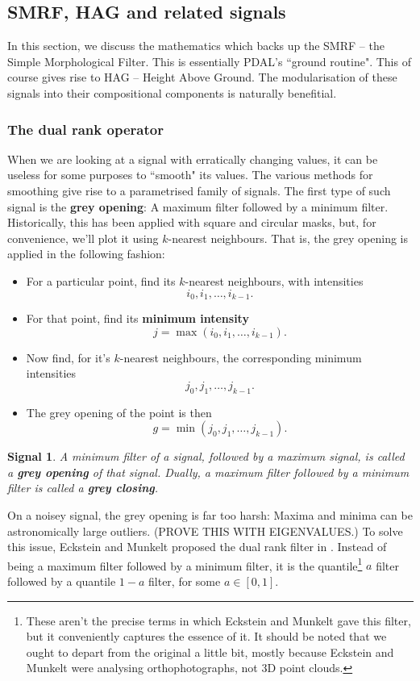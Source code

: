 \documentclass[a4paper,11pt,twoside]{article}
\newtheorem*{signals}{Signal}
\theoremstyle{definition}
\theoremstyle{remark}
\newenvironment{sigs}
   {\colorlet{shadecolor}{green!50}\begin{shaded}\begin{signals}}
   {\end{signals}\end{shaded}}
\begin{document}
\subsection{SMRF, HAG and related signals}\label{smrf}
In this section, we discuss the mathematics which backs up the SMRF -- the Simple Morphological Filter. This is essentially PDAL's ``ground routine". This of course gives rise to HAG -- Height Above Ground. The modularisation of these signals into their compositional components is naturally benefitial.
\subsubsection{The dual rank operator}\label{dual}
When we are looking at a signal with erratically changing values, it can be useless for some purposes to ``smooth" its values. The various methods for smoothing give rise to a parametrised family of signals. The first type of such signal is the \textbf{grey opening}: A maximum filter followed by a minimum filter. Historically, this has been applied with square and circular masks, but, for convenience, we'll plot it using $k$-nearest neighbours. That is, the grey opening is applied in the following fashion:
\begin{itemize}
\item For a particular point, find its $k$-nearest neighbours, with intensities $$i_0,i_1,\dots,i_{k-1}.$$
\item For that point, find its \textbf{minimum intensity} 
\begin{displaymath}
j=\max(i_0,i_1,\dots, i_{k-1}).
\end{displaymath}
\item Now find, for it's $k$-nearest neighbours, the corresponding minimum intensities $$j_0,j_1,\dots,j_{k-1}.$$
\item The grey opening of the point is then
\begin{displaymath}
g=\min(j_0,j_1,\dots,j_{k-1}).
\end{displaymath}
\end{itemize}
\begin{sigs}A minimum filter of a signal, followed by a maximum signal, is called a \textbf{grey opening} of that signal. Dually, a maximum filter followed by a minimum filter is called a \textbf{grey closing}.
\end{sigs}
On a noisey signal, the grey opening is far too harsh: Maxima and minima can be astronomically large outliers. (PROVE THIS WITH EIGENVALUES.) To solve this issue, Eckstein and Munkelt proposed the dual rank filter in \cite{eckstein}. Instead of being a maximum filter followed by a minimum filter, it is the quantile\footnote{These aren't the precise terms in which Eckstein and Munkelt gave this filter, but it conveniently captures the essence of it. It should be noted that we ought to depart from the original a little bit, mostly because Eckstein and Munkelt were analysing orthophotographs, not 3D point clouds.} $a$ filter followed by a quantile $1-a$ filter, for some $a\in[0,1]$.  
\end{document}

